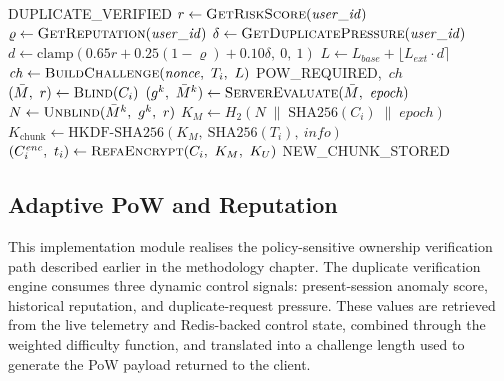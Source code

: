 \documentclass[12pt,a4paper,oneside]{report}
\newcommand{\Kchunk}{K_{\mathrm{chunk}}}
\newcommand{\HKDF}{\mathrm{HKDF\text{-}SHA256}}
\begin{document}
\begin{algorithm}[H]
\caption{Core Deduplication and Adaptive PoW Sub-Procedure}
\label{alg:dedup}
\begin{algorithmic}[1]
      \State {}
      \State {}
      \State \Return \textsc{DUPLICATE\_VERIFIED}
    \Else
      \State $r \gets \Call{GetRiskScore}{\mathit{user\_id}}$
      \State $\varrho \gets \Call{GetReputation}{\mathit{user\_id}}$
      \State $\delta \gets \Call{GetDuplicatePressure}{\mathit{user\_id}}$
      \State $d \gets \mathrm{clamp}(0.65r + 0.25(1-\varrho) + 0.10\delta,\ 0,\ 1)$
      \State $L \gets L_{\mathit{base}} + \lfloor L_{\mathit{ext}} \cdot d \rceil$
      \State $\mathit{ch} \gets \Call{BuildChallenge}{\mathit{nonce},\ T_i,\ L}$
      \State {}
      \State \Return \textsc{POW\_REQUIRED},\ $\mathit{ch}$
    \EndIf
  \Else
    \State $(\bar{M},\ r) \gets \Call{Blind}{C_i}$
    \State $(g^k,\ \bar{M}^k) \gets \Call{ServerEvaluate}{\bar{M},\ \mathit{epoch}}$
    \State $N \gets \Call{Unblind}{\bar{M}^k,\ g^k,\ r}$
    \State $K_M \gets H_2(N \;\|\; \mathrm{SHA256}(C_i) \;\|\; \mathit{epoch})$
    \State $\Kchunk \gets \HKDF(K_M,\ \mathrm{SHA256}(T_i),\ \mathit{info})$
    \State $(C_i^{\mathit{enc}},\ t_i) \gets \Call{RefaEncrypt}{C_i,\ K_M,\ K_U}$
    \State {}
    \State {}
    \State \Return \textsc{NEW\_CHUNK\_STORED}
  \EndIf
\EndProcedure
\end{algorithmic}
\end{algorithm}

\subsection{Adaptive PoW and Reputation}

This implementation module realises the policy-sensitive ownership verification path described earlier in the methodology chapter. The duplicate verification engine consumes three dynamic control signals: present-session anomaly score, historical reputation, and duplicate-request pressure. These values are retrieved from the live telemetry and Redis-backed control state, combined through the weighted difficulty function, and translated into a challenge length used to generate the PoW payload returned to the client.
\end{document}
